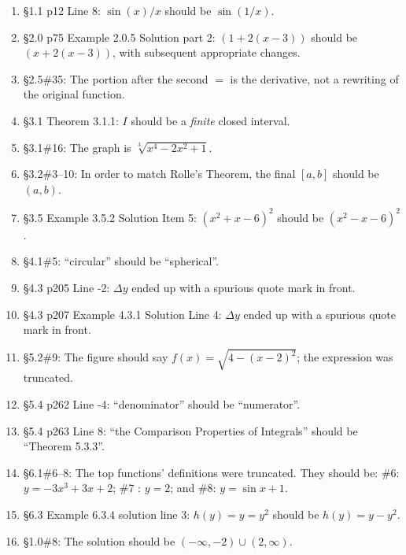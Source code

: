 \documentclass{amsart}
\begin{document}
\begin{enumerate}
\item \S1.1 p12 Line 8: $\sin(x)/x$ should be $\sin(1/x)$.
\item \S2.0 p75 Example 2.0.5 Solution part 2: $(1+2(x-3))$ should be $(x+2(x-3))$, with subsequent appropriate changes.
\item \S2.5\#35: The portion after the second $=$ is the derivative, not a rewriting of the original function.
\item \S3.1 Theorem 3.1.1: $I$ should be a \emph{finite} closed interval.
\item \S3.1\#16: The graph is $\sqrt[3]{x^4-2x^2+1}$.
\item \S3.2\#3--10: In order to match Rolle's Theorem, the final $[a,b]$ should be $(a,b)$.
\item \S3.5 Example 3.5.2 Solution Item 5: $(x^2+x-6)^2$ should be $(x^2-x-6)^2$.
\item \S4.1\#5: ``circular'' should be ``spherical''.
\item \S4.3 p205 Line -2: $\Delta y$ ended up with a spurious quote mark in front.
\item \S4.3 p207 Example 4.3.1 Solution Line 4: $\Delta y$ ended up with a spurious quote mark in front.
\item \S5.2\#9: The figure should say $f(x)=\sqrt{4-(x-2)^2}$; the expression was truncated.
\item \S5.4 p262 Line -4: ``denominator'' should be ``numerator''.
\item \S5.4 p263 Line 8: ``the Comparison Properties of Integrals'' should be ``Theorem 5.3.3''.
\item \S6.1\#6--8: The top functions' definitions were truncated.  They should be: \#6: $y=-3x^3+3x+2$; \#7 : $y=2$; and \#8: $y=\sin x+1$.
\item \S6.3 Example 6.3.4 solution line 3: $h(y)=y=y^2$ should be $h(y)=y-y^2$.
%
\item \S1.0\#8: The solution should be $(-\infty,-2)\cup(2,\infty)$.

\end{enumerate}
\end{document}
